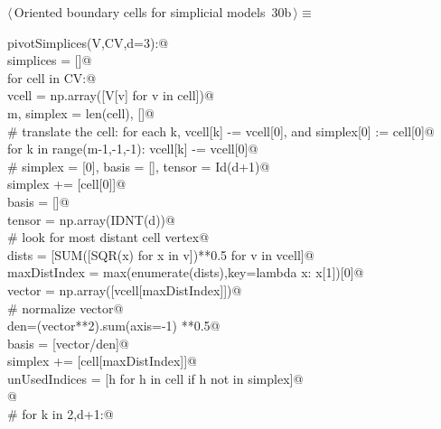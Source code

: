 \documentclass[11pt,oneside]{article}	%
\begin{document}
\begin{flushleft} \small \label{scrap53}
\protect{}$\langle\,$Oriented boundary cells for simplicial models\nobreak\ {\footnotesize 30b}$\,\rangle\equiv$
\vspace{-1ex}
\begin{list}{}{} \item
\mbox{}\verb@def pivotSimplices(V,CV,d=3):@\\
\mbox{}\verb@   simplices = []@\\
\mbox{}\verb@   for cell in CV:@\\
\mbox{}\verb@      vcell = np.array([V[v] for v in cell])@\\
\mbox{}\verb@      m, simplex = len(cell), []@\\
\mbox{}\verb@      # translate the cell: for each k, vcell[k] -= vcell[0], and simplex[0] := cell[0]@\\
\mbox{}\verb@      for k in range(m-1,-1,-1): vcell[k] -= vcell[0]@\\
\mbox{}\verb@      # simplex = [0], basis = [], tensor = Id(d+1)@\\
\mbox{}\verb@      simplex += [cell[0]]@\\
\mbox{}\verb@      basis = []@\\
\mbox{}\verb@      tensor = np.array(IDNT(d))@\\
\mbox{}\verb@      # look for most distant cell vertex@\\
\mbox{}\verb@      dists = [SUM([SQR(x) for x in v])**0.5 for v in vcell]@\\
\mbox{}\verb@      maxDistIndex = max(enumerate(dists),key=lambda x: x[1])[0]@\\
\mbox{}\verb@      vector = np.array([vcell[maxDistIndex]])@\\
\mbox{}\verb@      # normalize vector@\\
\mbox{}\verb@      den=(vector**2).sum(axis=-1) **0.5@\\
\mbox{}\verb@      basis = [vector/den]@\\
\mbox{}\verb@      simplex += [cell[maxDistIndex]]@\\
\mbox{}\verb@      unUsedIndices = [h for h in cell if h not in simplex]@\\
\mbox{}\verb@      @\\
\mbox{}\verb@      # for k in {2,d+1}:@\\

\end{list}
\end{flushleft}
\end{document}
